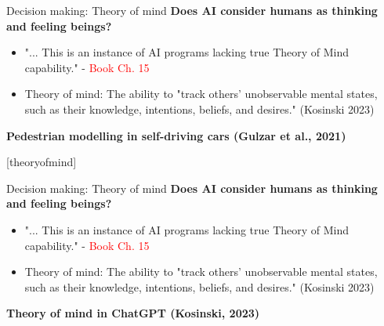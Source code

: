\documentclass[8pt]{beamer}
\begin{document}
	\begin{frame}[t]{Decision making: Theory of mind}
		\textbf{Does AI consider humans as thinking and feeling beings?}
		\begin{itemize}
			\item "... This is an instance of AI programs lacking true Theory of Mind capability." - \textcolor{red}{Book Ch. 15}
			\item Theory of mind: The ability to "track others' unobservable mental states, such as their knowledge, intentions, beliefs, and desires." (Kosinski 2023)
		\end{itemize}
		\textbf{Pedestrian modelling in self-driving cars (Gulzar et al., 2021)}\\
		\centering
		\vspace{0.5cm}
	\end{frame}

	[theoryofmind]

	\begin{frame}[t]{Decision making: Theory of mind}
		\textbf{Does AI consider humans as thinking and feeling beings?}
		\begin{itemize}
			\item "... This is an instance of AI programs lacking true Theory of Mind capability." - \textcolor{red}{Book Ch. 15}
			\item Theory of mind: The ability to "track others' unobservable mental states, such as their knowledge, intentions, beliefs, and desires." (Kosinski 2023)
		\end{itemize}
		\textbf{Theory of mind in ChatGPT (Kosinski, 2023)}\\
		\centering
		\vspace{0.5cm}
	\end{frame}
\end{document}
